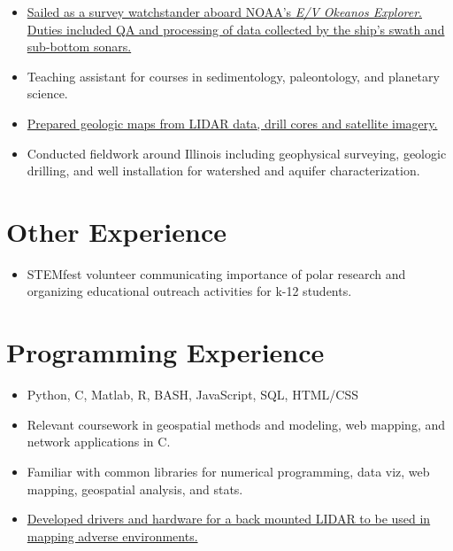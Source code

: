 \documentclass{cv_TOH}
\begin{document}
\begin{itemize}
\item \href{http://www.niutoday.info/2014/04/17/niu-student-lands-coveted-internship-aboard-exploration-ship/}{Sailed as a survey watchstander aboard NOAA's \textit{E/V Okeanos Explorer}. Duties included QA and processing of data collected by the ship's swath and sub-bottom sonars.}
\end{itemize}

\begin{itemize}
\item Teaching assistant for courses in sedimentology, paleontology, and planetary science.
\end{itemize}

\begin{itemize}
\item \href{http://www.isgs.illinois.edu/sites/isgs/files/maps/isgs-quads/aurora-south-sg.pdf}{Prepared geologic maps from LIDAR data, drill cores and satellite imagery.}
\item Conducted fieldwork around Illinois including geophysical surveying, geologic drilling, and well installation for watershed and aquifer characterization. 
\end{itemize}

\section{Other Experience}
\begin{itemize}
\item STEMfest volunteer communicating importance of polar research and organizing educational outreach activities for k-12 students.
\end{itemize}

\section{Programming Experience}
\begin{itemize}
\item Python, C, Matlab, R, BASH, JavaScript, SQL, HTML/CSS
\item Relevant coursework in geospatial methods and modeling, web mapping, and network applications in C.
\item Familiar with common libraries for numerical programming, data viz, web mapping, geospatial analysis, and stats.
\item \href{https://github.com/tohodson/velodyne_tools}{Developed drivers and hardware for a back mounted LIDAR to be used in mapping adverse environments.}
\end{itemize}
\end{document}
